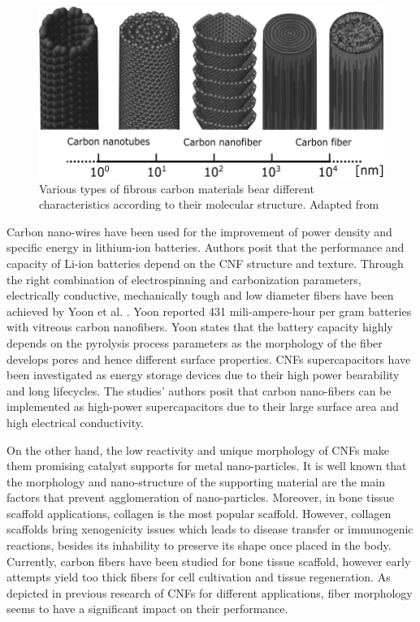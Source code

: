 \begin{figure}[!th]
\centering
\includegraphics[scale=0.65]{./Figures/carbonFiberDiameterComparison.png}
\decoRule
\caption[Diameter comparison of various types of fibrous carbon materials]{Various types of fibrous carbon materials bear different characteristics according to their molecular structure. Adapted from \cite{Vajtai2013}}
\label{fig:diameterComparisonOfCarbonFibers}
\end{figure}

Carbon nano-wires have been used for the improvement of power density and specific energy in lithium-ion batteries. \cite{Frackowiak2002, Endo2000, Winter1998} Authors posit that the performance and capacity of Li-ion batteries depend on the CNF structure and texture. Through the right combination of electrospinning and carbonization parameters, electrically conductive, mechanically tough and low diameter fibers have been achieved by Yoon et al. \cite{Yoon2004}. Yoon reported 431 mili-ampere-hour per gram batteries with vitreous carbon nanofibers. Yoon states that the battery capacity highly depends on the pyrolysis process parameters as the morphology of the fiber develops pores and hence different surface properties. CNFs supercapacitors have been investigated as energy storage devices due to their high power bearability and long lifecycles. \cite{Endo2001, Frackowiak2001, Pandolfo2006, Conway1999} The studies' authors posit that carbon nano-fibers can be implemented as high-power supercapacitors due to their large surface area and high electrical conductivity.

On the other hand, the low reactivity and unique morphology of CNFs make them promising catalyst supports for metal nano-particles. \cite{Choi2002, Li2002, Planeix1994} It is well known that the morphology and nano-structure of the supporting material are the main factors that prevent agglomeration of nano-particles. \cite{RomanMartinez1995, Serp2008} Moreover, in bone tissue scaffold applications, collagen is the most popular scaffold. However, collagen scaffolds bring xenogenicity issues which leads to disease transfer or immunogenic reactions, besides its inhability to preserve its shape once placed in the body. \cite{Bach1998, Butler1998, Delustro1990, Chachques2008, Atala2006, Glowacki2008, Valarmathi2008, Faraj2007} Currently, carbon fibers have been studied for bone tissue scaffold, however early attempts yield too thick fibers for cell cultivation and tissue regeneration. \cite{Visuri1991, Parsons1989} As depicted in previous research of CNFs for different applications, fiber morphology seems to have a significant impact on their performance. 

